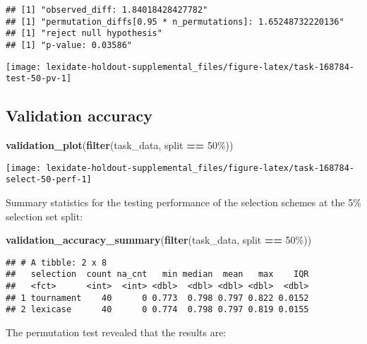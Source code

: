 \documentclass[
]{book}
\newenvironment{Shaded}{\begin{snugshade}}{\end{snugshade}}
\newcommand{\FunctionTok}[1]{\textcolor[rgb]{0.13,0.29,0.53}{\textbf{#1}}}
\newcommand{\NormalTok}[1]{#1}
\newcommand{\SpecialCharTok}[1]{\textcolor[rgb]{0.81,0.36,0.00}{\textbf{#1}}}
\newcommand{\StringTok}[1]{\textcolor[rgb]{0.31,0.60,0.02}{#1}}
\begin{document}
\begin{verbatim}
## [1] "observed_diff: 1.84018428427782"
## [1] "permutation_diffs[0.95 * n_permutations]: 1.65248732220136"
## [1] "reject null hypothesis"
## [1] "p-value: 0.03586"
\end{verbatim}

\texttt{[image: lexidate-holdout-supplemental\_files/figure-latex/task-168784-test-50-pv-1]}

\hypertarget{validation-accuracy-52}{%
\subsection{Validation accuracy}\label{validation-accuracy-52}}

\begin{Shaded}
\begin{Highlighting}[]
\FunctionTok{validation\_plot}\NormalTok{(}\FunctionTok{filter}\NormalTok{(task\_data, split }\SpecialCharTok{==} \StringTok{\textquotesingle{}50\%\textquotesingle{}}\NormalTok{))}
\end{Highlighting}
\end{Shaded}

\texttt{[image: lexidate-holdout-supplemental\_files/figure-latex/task-168784-select-50-perf-1]}

Summary statistics for the testing performance of the selection schemes at the 5\% selection set split:

\begin{Shaded}
\begin{Highlighting}[]
\FunctionTok{validation\_accuracy\_summary}\NormalTok{(}\FunctionTok{filter}\NormalTok{(task\_data, split }\SpecialCharTok{==} \StringTok{\textquotesingle{}50\%\textquotesingle{}}\NormalTok{))}
\end{Highlighting}
\end{Shaded}

\begin{verbatim}
## # A tibble: 2 x 8
##   selection  count na_cnt   min median  mean   max    IQR
##   <fct>      <int>  <int> <dbl>  <dbl> <dbl> <dbl>  <dbl>
## 1 tournament    40      0 0.773  0.798 0.797 0.822 0.0152
## 2 lexicase      40      0 0.774  0.798 0.797 0.819 0.0155
\end{verbatim}

The permutation test revealed that the results are:
\end{document}
